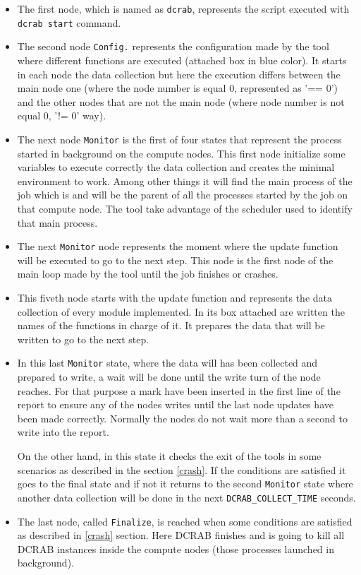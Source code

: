 \documentclass[10pt,a4paper]{report}
\begin{document}
\begin{itemize}
  \item The first node, which is named as \verb+dcrab+, represents the script executed with \verb+dcrab start+ command.
  \item The second node \verb+Config.+ represents the configuration made by the tool where different functions are executed (attached box in blue color). It starts in each node the data collection but here the execution differs between the main node one (where the node number is equal 0, represented as '== 0') and the other nodes that are not the main node (where node number is not equal 0, '!= 0' way).
  \item The next node \verb+Monitor+ is the first of four states that represent the process started in background on the compute nodes. This first node initialize some variables to execute correctly the data collection and creates the minimal environment to work. Among other things it will find the main process of the job which is and will be the parent of all the processes started by the job on that compute node. The tool take advantage of the scheduler used to identify that main process.
  \item The next \verb+Monitor+ node represents the moment where the update function will be executed to go to the next step. This node is the first node of the main loop made by the tool until the job finishes or crashes.
  \item This fiveth node starts with the update function and represents the data collection of every module implemented. In its box attached are written the names of the functions in charge of it. It prepares the data that will be written to go to the next step.
  \item In this last \verb+Monitor+ state, where the data will has been collected and prepared to write, a wait will be done until the write turn of the node reaches. For that purpose a mark have been inserted in the first line of the report to ensure any of the nodes writes until the last node updates have been made correctly. Normally the nodes do not wait more than a second to write into the report.

  On the other hand, in this state it checks the exit of the tools in some scenarios as described in the section \ref{crash}. If the conditions are satisfied it goes to the final state and if not it returns to the second \verb+Monitor+ state where another data collection will be done in the next \verb+DCRAB_COLLECT_TIME+ seconds.
  \item The last node, called \verb+Finalize+, is reached when some conditions are satisfied as described in \ref{crash} section. Here DCRAB finishes and is going to kill all DCRAB instances inside the compute nodes (those processes launched in background).
\end{itemize}
\end{document}
